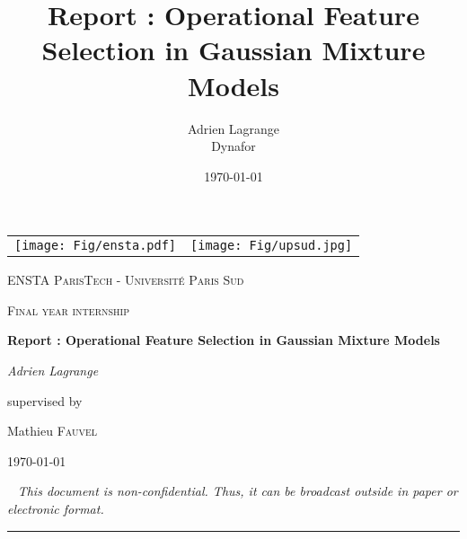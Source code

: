 \documentclass[a4paper,11pt,DIV=16,abstracton]{scrartcl}
\title{Report : Operational Feature Selection in Gaussian Mixture Models}
\author{Adrien Lagrange
\\
\small{Dynafor}}
\date{\today}
\newcommand\blankpage{%
    \null
    \thispagestyle{empty}%
    \newpage}
\begin{document}

\begin{titlepage}
    \centering
    \begin{tabular}{cc}
        \texttt{[image: Fig/ensta.pdf]}\par\vspace{1cm} &
        \texttt{[image: Fig/upsud.jpg]}\par\vspace{1cm} \\
    \end{tabular}

    {\scshape\LARGE ENSTA ParisTech - Université Paris Sud \par}
    \vspace{1cm}
    {\scshape\Large Final year internship\par}
    \vspace{1.5cm}
    {\huge\bfseries Report : Operational Feature Selection in Gaussian Mixture Models\par}
    \vspace{2cm}
    {\Large\itshape Adrien Lagrange\par}
    \vfill
    supervised by\par
    Mathieu \textsc{Fauvel}

    \vfill

    {\large \today\par}

\end{titlepage}

\thispagestyle{empty}
\mbox{~}
\vfill
{\color{red}\Large\itshape This document is non-confidential. Thus, it can be broadcast outside in paper or electronic format.}
\newpage

\noindent\rule{\textwidth}{1.5pt}
\end{document}
